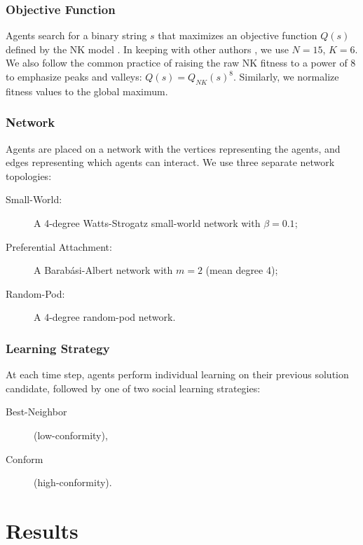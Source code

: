 \documentclass[manuscript,screen,review,acmsmall]{acmart}
\begin{document}
\subsubsection{Objective Function}
Agents search for a binary string $s$ that maximizes an objective
function $Q(s)$ defined by the NK model \cite{kauffman_towards_1987, weinberger_local_1991}.
In keeping with other authors \cite{lazer_network_2007, barkoczi_social_2016}, we use $N=15$, $K=6$.
We also follow the common practice of raising the raw NK fitness to a power of 8
to emphasize peaks and valleys: $Q(s) = Q_{NK}(s)^8$.
Similarly, we normalize fitness values to the global maximum.

\subsubsection{Network}
Agents are placed on a network with the vertices representing
the agents, and edges representing which agents can interact.
We use three separate network topologies:
\begin{description}
    \item[Small-World:]{A 4-degree Watts-Strogatz small-world network with $\beta = 0.1$;}
    \item[Preferential Attachment:]{A Barabási-Albert network with $m=2$ (mean degree 4);}
    \item[Random-Pod:]{A 4-degree random-pod network.}
\end{description}

\subsubsection{Learning Strategy}
At each time step, agents perform individual learning on their previous
solution candidate, followed by one of two social learning strategies:
\begin{description}
\item[Best-Neighbor]{(low-conformity)},
\item[Conform]{(high-conformity)}.
\end{description}

\section{Results}
\end{document}
